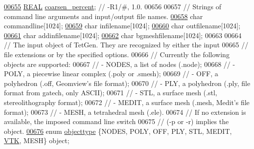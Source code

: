 \begin{DoxyCode}
\hypertarget{tetgen_8h_source.tex_l00655}{}\hyperlink{classtetgenbehavior_ac9aa3f69cf550eb2ee81fc0cae2fb444}{00655}   \hyperlink{tetgen_8h_a4b654506f18b8bfd61ad2a29a7e38c25}{REAL} \hyperlink{classtetgenbehavior_ac9aa3f69cf550eb2ee81fc0cae2fb444}{coarsen\_percent};                                         \textcolor{comment}{// -R1/#, 1.0.}
00656 
00657   \textcolor{comment}{// Strings of command line arguments and input/output file names.}
\hypertarget{tetgen_8h_source.tex_l00658}{}\hyperlink{classtetgenbehavior_a56dcfc2ab395c63b7f99d84b2cd1f4e8}{00658}   \textcolor{keywordtype}{char} commandline[1024];
\hypertarget{tetgen_8h_source.tex_l00659}{}\hyperlink{classtetgenbehavior_ac879f6843038d5428199079c515ce6e6}{00659}   \textcolor{keywordtype}{char} infilename[1024];
\hypertarget{tetgen_8h_source.tex_l00660}{}\hyperlink{classtetgenbehavior_aa066e0b8f2b5b3d0f9e5c6b74e8eadc4}{00660}   \textcolor{keywordtype}{char} outfilename[1024];
\hypertarget{tetgen_8h_source.tex_l00661}{}\hyperlink{classtetgenbehavior_a627804470698cc1883fd93999727e334}{00661}   \textcolor{keywordtype}{char} addinfilename[1024];
\hypertarget{tetgen_8h_source.tex_l00662}{}\hyperlink{classtetgenbehavior_ae72a1c6b8d7389d4fad21fa584207aba}{00662}   \textcolor{keywordtype}{char} bgmeshfilename[1024];
00663 
00664   \textcolor{comment}{// The input object of TetGen. They are recognized by either the input }
00665   \textcolor{comment}{//   file extensions or by the specified options. }
00666   \textcolor{comment}{// Currently the following objects are supported:}
00667   \textcolor{comment}{//   - NODES, a list of nodes (.node); }
00668   \textcolor{comment}{//   - POLY, a piecewise linear complex (.poly or .smesh); }
00669   \textcolor{comment}{//   - OFF, a polyhedron (.off, Geomview's file format); }
00670   \textcolor{comment}{//   - PLY, a polyhedron (.ply, file format from gatech, only ASCII);}
00671   \textcolor{comment}{//   - STL, a surface mesh (.stl, stereolithography format);}
00672   \textcolor{comment}{//   - MEDIT, a surface mesh (.mesh, Medit's file format); }
00673   \textcolor{comment}{//   - MESH, a tetrahedral mesh (.ele).}
00674   \textcolor{comment}{// If no extension is available, the imposed command line switch}
00675   \textcolor{comment}{//   (-p or -r) implies the object. }
\hypertarget{tetgen_8h_source.tex_l00676}{}\hyperlink{classtetgenbehavior_aeea08e7334fde4251b74a8247bcc54b8a20dc5e713ee0d2cb7564ad72a9bcdd59}{00676}   \textcolor{keyword}{enum} \hyperlink{classtetgenbehavior_aeea08e7334fde4251b74a8247bcc54b8}{objecttype} \{NODES, POLY, OFF, PLY, STL, MEDIT, \hyperlink{classtetgenbehavior_aeea08e7334fde4251b74a8247bcc54b8a20dc5e713ee0d2cb7564ad72a9bcdd59}{VTK}, MESH\} object;

\end{DoxyCode}
